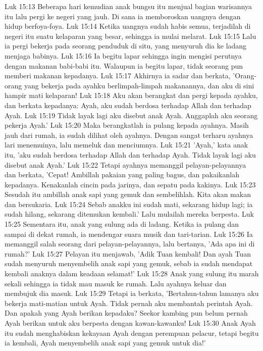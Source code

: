 Luk 15:13  Beberapa hari kemudian anak bungsu itu menjual bagian warisannya itu lalu pergi ke negeri yang jauh. Di sana ia memboroskan uangnya dengan hidup berfoya-foya.
Luk 15:14  Ketika uangnya sudah habis semua, terjadilah di negeri itu suatu kelaparan yang besar, sehingga ia mulai melarat.
Luk 15:15  Lalu ia pergi bekerja pada seorang penduduk di situ, yang menyuruh dia ke ladang menjaga babinya.
Luk 15:16  Ia begitu lapar sehingga ingin mengisi perutnya dengan makanan babi-babi itu. Walaupun ia begitu lapar, tidak seorang pun memberi makanan kepadanya.
Luk 15:17  Akhirnya ia sadar dan berkata, 'Orang-orang yang bekerja pada ayahku berlimpah-limpah makanannya, dan aku di sini hampir mati kelaparan!
Luk 15:18  Aku akan berangkat dan pergi kepada ayahku, dan berkata kepadanya: Ayah, aku sudah berdosa terhadap Allah dan terhadap Ayah.
Luk 15:19  Tidak layak lagi aku disebut anak Ayah. Anggaplah aku seorang pekerja Ayah.'
Luk 15:20  Maka berangkatlah ia pulang kepada ayahnya. Masih jauh dari rumah, ia sudah dilihat oleh ayahnya. Dengan sangat terharu ayahnya lari menemuinya, lalu memeluk dan menciumnya.
Luk 15:21  'Ayah,' kata anak itu, 'aku sudah berdosa terhadap Allah dan terhadap Ayah. Tidak layak lagi aku disebut anak Ayah.'
Luk 15:22  Tetapi ayahnya memanggil pelayan-pelayannya dan berkata, 'Cepat! Ambillah pakaian yang paling bagus, dan pakaikanlah kepadanya. Kenakanlah cincin pada jarinya, dan sepatu pada kakinya.
Luk 15:23  Sesudah itu ambillah anak sapi yang gemuk dan sembelihlah. Kita akan makan dan bersukaria.
Luk 15:24  Sebab anakku ini sudah mati, sekarang hidup lagi; ia sudah hilang, sekarang ditemukan kembali.' Lalu mulailah mereka berpesta.
Luk 15:25  Sementara itu, anak yang sulung ada di ladang. Ketika ia pulang dan sampai di dekat rumah, ia mendengar suara musik dan tari-tarian.
Luk 15:26  Ia memanggil salah seorang dari pelayan-pelayannya, lalu bertanya, 'Ada apa ini di rumah?'
Luk 15:27  Pelayan itu menjawab, 'Adik Tuan kembali! Dan ayah Tuan sudah menyuruh menyembelih anak sapi yang gemuk, sebab ia sudah mendapat kembali anaknya dalam keadaan selamat!'
Luk 15:28  Anak yang sulung itu marah sekali sehingga ia tidak mau masuk ke rumah. Lalu ayahnya keluar dan membujuk dia masuk.
Luk 15:29  Tetapi ia berkata, 'Bertahun-tahun lamanya aku bekerja mati-matian untuk Ayah. Tidak pernah aku membantah perintah Ayah. Dan apakah yang Ayah berikan kepadaku? Seekor kambing pun belum pernah Ayah berikan untuk aku berpesta dengan kawan-kawanku!
Luk 15:30  Anak Ayah itu sudah menghabiskan kekayaan Ayah dengan perempuan pelacur, tetapi begitu ia kembali, Ayah menyembelih anak sapi yang gemuk untuk dia!'
